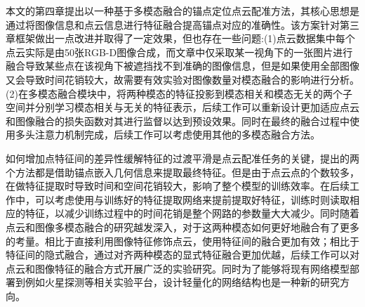 本文的第四章提出以一种基于多模态融合的锚点定位点云配准方法，其核心思想是通过将图像信息和点云信息进行特征融合提高锚点对应的准确性。该方案针对第三章框架做出一点改进并取得了一定效果，但也存在一些问题:(1)点云数据集中每个点云实际是由50张RGB-D图像合成，而文章中仅采取某一视角下的一张图片进行融合导致某些点在该视角下被遮挡找不到准确的图像信息，但是如果使用全部图像又会导致时间花销较大，故需要有效实验对图像数量对模态融合的影响进行分析。(2)在多模态融合模块中，将两种模态的特征投影到模态相关和模态无关的两个子空间并分别学习模态相关与无关的特征表示，后续工作可以重新设计更加适应点云和图像融合的损失函数对其进行监督以达到预设效果。同时在最终的融合过程中使用多头注意力机制完成，后续工作可以考虑使用其他的多模态融合方法。

如何增加点特征间的差异性缓解特征的过渡平滑是点云配准任务的关键，提出的两个方法都是借助锚点嵌入几何信息来提取最终特征。但是由于点云点的个数较多，在做特征提取时导致时间和空间花销较大，影响了整个模型的训练效率。在后续工作中，可以考虑使用与训练好的特征提取网络来提前提取好特征，训练时则读取相应的特征，以减少训练过程中的时间花销是整个网路的参数量大大减少。同时随着点云和图像多模态融合的研究越发深入，对于这两种模态如何更好地融合有了更多的考量。相比于直接利用图像特征修饰点云，使用特征间的融合更加有效；相比于特征间的隐式融合，通过对齐两种模态的显式特征融合更加优越，后续工作可以对点云和图像特征的融合方式开展广泛的实验研究。同时为了能够将现有网络模型部署到例如火星探测等相关实验平台，设计轻量化的网络结构也是一种新的研究方向。